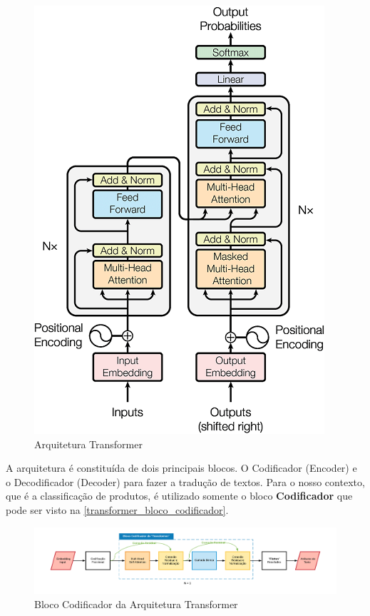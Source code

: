 \begin{figure}[]
	\caption{\label{transformer_architecture} Arquitetura Transformer}
	\begin{center}
	    \includegraphics[scale=0.5]{artigo/recursos/imagens/transformer_architecture.png}
	\end{center}
\end{figure}

A arquitetura é constituída de dois principais blocos. O Codificador (Encoder) e o Decodificador (Decoder) para fazer a tradução de textos. Para o nosso contexto, que é a classificação de produtos, é utilizado somente o bloco \textbf{Codificador} que pode ser visto na \autoref{transformer_bloco_codificador}.

\begin{figure}[]
	\caption{\label{transformer_bloco_codificador} Bloco Codificador da Arquitetura Transformer}
	\begin{center}
	    \includegraphics[scale=0.5]{artigo/recursos/imagens/transformer_bloco_codificador.png}
	\end{center}
\end{figure}


